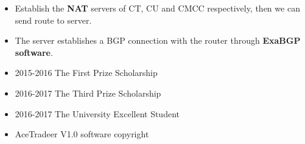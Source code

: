 \documentclass[12pt,a4paper,ragged2e]{altacv}
\begin{document}
\setlength{\baselineskip}{16pt}
\begin{itemize}
\justifying
\item Establish the \textbf{NAT} servers of CT, CU and CMCC respectively, then we can send route to server.
\item The server establishes a BGP connection with the router through \textbf{ExaBGP software}.
\end{itemize}


\begin{itemize}
\item 2015-2016 The First Prize Scholarship
\item 2016-2017 The Third Prize Scholarship
\item 2016-2017 The University Excellent Student 
\item AceTradeer V1.0 software copyright
\end{itemize}


\clearpage
\nocite{*}


\begin{fullwidth}
\makecvheader
\end{fullwidth}




\divider
\end{document}
